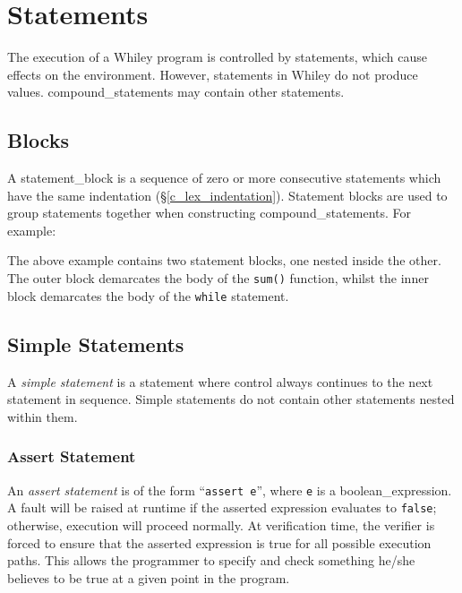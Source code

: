 \chapter{Statements}
\label{c_statements}
The execution of a Whiley program is controlled by \gls{statement}s, which cause effects on the environment.  However, statements in Whiley do not produce values.  \Glspl{compound_statement} may contain other statements.

\section{Blocks}
\label{c_stmts_blocks}

A \gls{statement_block} is a sequence of zero or more consecutive statements which have the same indentation (\S\ref{c_lex_indentation}).  Statement blocks are used to group statements together when constructing \gls{compound_statement}s.  For example:



The above example contains two statement blocks, one nested inside the other.  The outer block demarcates the body of the \lstinline{sum()} function, whilst the inner block demarcates the body of the \lstinline{while} statement.


\section{Simple Statements}

A {\em simple statement} is a statement where control always continues to the next statement in sequence.  Simple statements do not contain other statements nested within them.


\subsection{Assert Statement}

An {\em assert statement} is of the form ``\lstinline{assert e}'', where \lstinline{e} is a \gls{boolean_expression}.  A \gls{fault} will be raised at runtime if the asserted expression evaluates to \lstinline{false}; otherwise, execution will proceed normally.  At verification time, the verifier is forced to ensure that the asserted expression is true for all possible execution paths.  This allows the programmer to specify and check something he/she believes to be true at a given point in the program.

